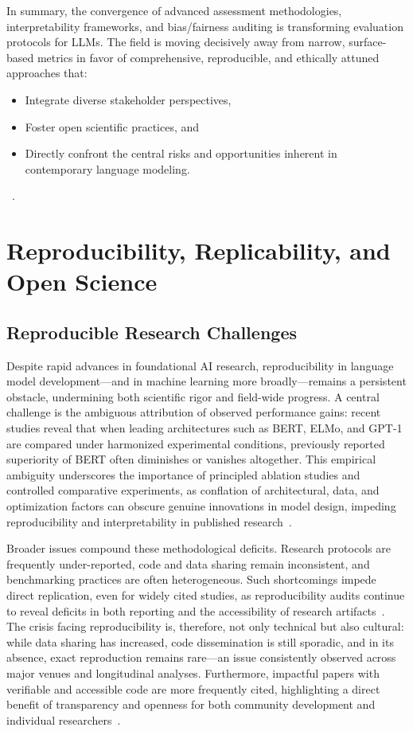 \documentclass[sigconf]{acmart}
\begin{document}
In summary, the convergence of advanced assessment methodologies, interpretability frameworks, and bias/fairness auditing is transforming evaluation protocols for LLMs. The field is moving decisively away from narrow, surface-based metrics in favor of comprehensive, reproducible, and ethically attuned approaches that:
\begin{itemize}
    \item Integrate diverse stakeholder perspectives,
    \item Foster open scientific practices, and
    \item Directly confront the central risks and opportunities inherent in contemporary language modeling.
\end{itemize}
~\cite{ref1, ref3, ref10, ref14, ref19, ref35, ref36, ref43, ref45, ref46, ref49, ref52, ref65, ref73, ref76, ref81, ref83, ref84, ref85, ref91, ref94, ref95, ref101, ref104, ref106, ref108}.

\section{Reproducibility, Replicability, and Open Science}

\subsection{Reproducible Research Challenges}

Despite rapid advances in foundational AI research, reproducibility in language model development—and in machine learning more broadly—remains a persistent obstacle, undermining both scientific rigor and field-wide progress. A central challenge is the ambiguous attribution of observed performance gains: recent studies reveal that when leading architectures such as BERT, ELMo, and GPT-1 are compared under harmonized experimental conditions, previously reported superiority of BERT often diminishes or vanishes altogether. This empirical ambiguity underscores the importance of principled ablation studies and controlled comparative experiments, as conflation of architectural, data, and optimization factors can obscure genuine innovations in model design, impeding reproducibility and interpretability in published research~\cite{ref107}.

Broader issues compound these methodological deficits. Research protocols are frequently under-reported, code and data sharing remain inconsistent, and benchmarking practices are often heterogeneous. Such shortcomings impede direct replication, even for widely cited studies, as reproducibility audits continue to reveal deficits in both reporting and the accessibility of research artifacts~\cite{ref107,ref108}. The crisis facing reproducibility is, therefore, not only technical but also cultural: while data sharing has increased, code dissemination is still sporadic, and in its absence, exact reproduction remains rare—an issue consistently observed across major venues and longitudinal analyses. Furthermore, impactful papers with verifiable and accessible code are more frequently cited, highlighting a direct benefit of transparency and openness for both community development and individual researchers~\cite{ref108}.
\end{document}
